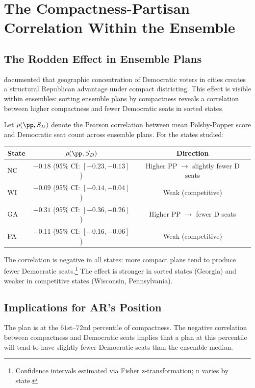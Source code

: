 \section{The Compactness-Partisan Correlation Within the Ensemble}
\label{sec:correlation}

\subsection{The Rodden Effect in Ensemble Plans}

\citet{rodden2019why} documented that geographic concentration of Democratic
voters in cities creates a structural Republican advantage under compact
districting.  This effect is visible within \recom{} ensembles: sorting
ensemble plans by compactness reveals a correlation between higher compactness
and fewer Democratic seats in sorted states.

Let $\rho(\pp, S_D)$ denote the Pearson correlation between mean Polsby-Popper
score and Democratic seat count across ensemble plans.  For the states studied:

\begin{center}
\begin{tabular}{lcc}
\toprule
State & $\rho(\pp, S_D)$ & Direction \\
\midrule
NC & $-0.18$ (95\% CI: $[-0.23, -0.13]$) & Higher PP $\to$ slightly fewer D seats \\
WI & $-0.09$ (95\% CI: $[-0.14, -0.04]$) & Weak (competitive) \\
GA & $-0.31$ (95\% CI: $[-0.36, -0.26]$) & Higher PP $\to$ fewer D seats \\
PA & $-0.11$ (95\% CI: $[-0.16, -0.06]$) & Weak (competitive) \\
\bottomrule
\end{tabular}
\end{center}

The correlation is negative in all states: more compact plans tend to produce
fewer Democratic seats.\footnote{Confidence intervals estimated via Fisher z-transformation; n varies by state.}  The effect is stronger in sorted states (Georgia)
and weaker in competitive states (Wisconsin, Pennsylvania).

\subsection{Implications for AR's Position}

The \ar{} plan is at the $61$st--$72$nd percentile of compactness.  The
negative correlation between compactness and Democratic seats implies that
a plan at this percentile will tend to have slightly fewer Democratic seats
than the ensemble median.

